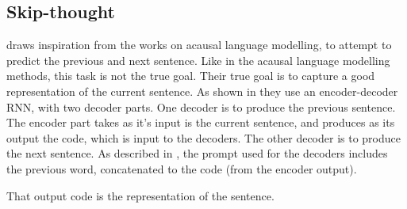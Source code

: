 \documentclass[12pt,parskip]{komatufte}
\begin{document}
\subsection{Skip-thought}
 draws inspiration from the works on acausal language modelling, to attempt to predict the previous and next sentence.
Like in the acausal language modelling methods, this task is not the true goal.
Their true goal is to capture a good representation of the current sentence.
As shown in  they use an encoder-decoder RNN, with two decoder parts.
One decoder is to produce the previous sentence.
The encoder part takes as it's input is the current sentence, and produces as its  output the code,
which is input to the decoders.
The other decoder is to produce the next sentence.
As described in , the prompt used for the decoders includes the previous word, concatenated to the code (from the encoder output).

That output code is the representation of the sentence.
\end{document}

